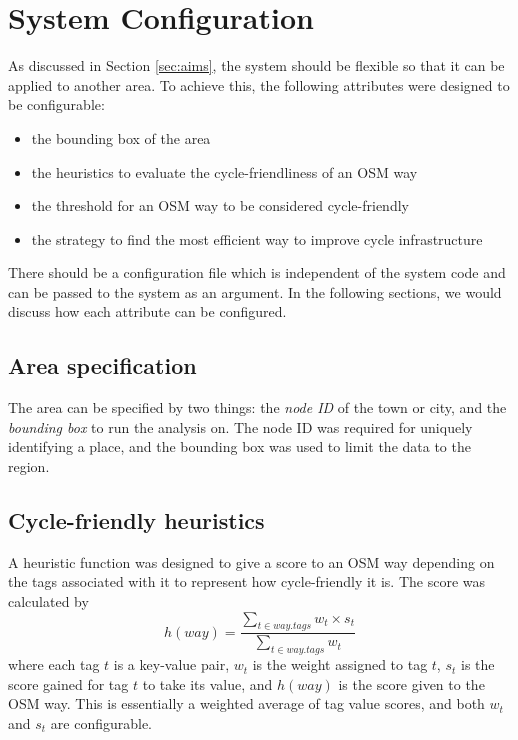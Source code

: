 \documentclass[12pt,a4paper]{report}
\begin{document}
\section{System Configuration}
As discussed in Section \ref{sec:aims}, the system should be flexible so that it can be applied to another area. To achieve this, the following attributes were designed to be configurable:

\begin{itemize}
    \item the bounding box of the area
    \item the heuristics to evaluate the cycle-friendliness of an OSM way
    \item the threshold for an OSM way to be considered cycle-friendly
    \item the strategy to find the most efficient way to improve cycle infrastructure
\end{itemize}

There should be a configuration file which is independent of the system code and can be passed to the system as an argument. In the following sections, we would discuss how each attribute can be configured.

\subsection{Area specification}
The area can be specified by two things: the \textit{node ID} of the town or city, and the \textit{bounding box} to run the analysis on. The node ID was required for uniquely identifying a place, and the bounding box was used to limit the data to the region.

\subsection{Cycle-friendly heuristics} \label{sec:cycle_heuristic}
A heuristic function was designed to give a score to an OSM way depending on the tags associated with it to represent how cycle-friendly it is. The score was calculated by
\begin{equation}\label{eq:heuristic}
    h(way) = \frac{\sum_{t\in way.tags} w_t \times s_t}{\sum_{t\in way.tags} w_t}
\end{equation}
where each tag $t$ is a key-value pair, $w_t$ is the weight assigned to tag $t$, $s_t$ is the score gained for tag $t$ to take its value, and $h(way)$ is the score given to the OSM way. This is essentially a weighted average of tag value scores, and both $w_t$ and $s_t$ are configurable. 
\end{document}
